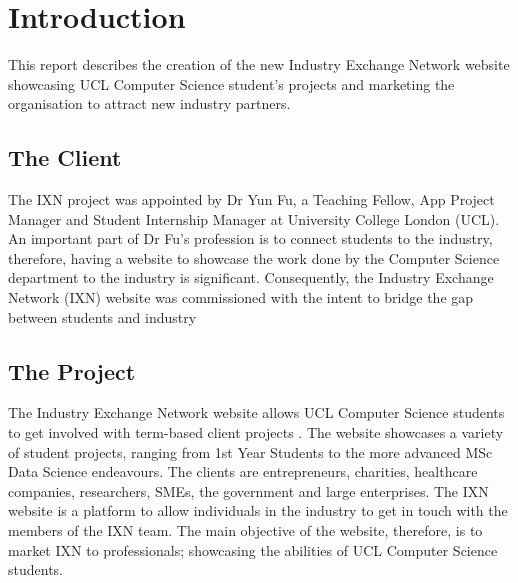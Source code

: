 \documentclass[fontsize=10pt]{extarticle}
\numberwithin{figure}{section} %
\begin{document}
\newpage

\clearpage
{}
\hypertarget{introduction}{%
\section{Introduction}\label{introduction}}

This report describes the creation of the new Industry Exchange Network
website showcasing UCL Computer Science student's projects and marketing
the organisation to attract new industry partners.

\hypertarget{the-client}{%
\subsection{The Client}\label{the-client}}

The IXN project was appointed by Dr Yun Fu, a Teaching Fellow, App
Project Manager and Student Internship Manager at University College
London (UCL). An important part of Dr Fu's profession is to connect
students to the industry, therefore, having a website to showcase the
work done by the Computer Science department to the industry is
significant. Consequently, the Industry Exchange Network (IXN) website
was commissioned with the intent to bridge the gap between students and
industry

\hypertarget{the-project}{%
\subsection{The Project}\label{the-project}}

The Industry Exchange Network website allows UCL Computer Science
students to get involved with term-based client projects \cite{g1}. The
website showcases a variety of student projects, ranging from 1st Year
Students to the more advanced MSc Data Science endeavours. The clients
are entrepreneurs, charities, healthcare companies, researchers, SMEs,
the government and large enterprises. The IXN website is a platform to
allow individuals in the industry to get in touch with the members of
the IXN team. The main objective of the website, therefore, is to market
IXN to professionals; showcasing the abilities of UCL Computer Science
students.
\end{document}
